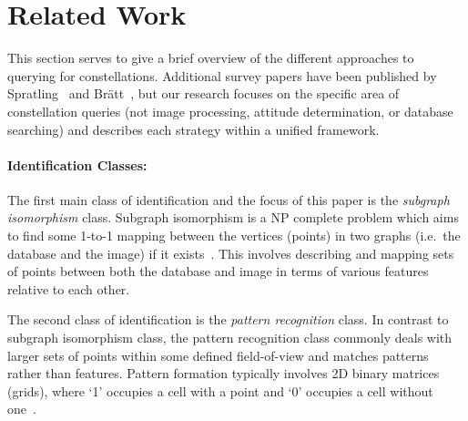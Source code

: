 \newcommand{\nsubparagraph}[1]{\paragraph{#1:}}

\section{Related Work}\label{sec:relatedWork}
\begin{figure}
\end{figure}

This section serves to give a brief overview of the different approaches to querying for constellations.
Additional survey papers have been published by Spratling~\cite{spratling:surveyStarIdentification} and
Br\"{a}tt~\cite{bratt:analysisStarIdentification}, but our research focuses on the specific area of constellation
queries (not image processing, attitude determination, or database searching) and describes each strategy within a unified framework.

\nsubparagraph{Identification Classes}
The first main class of identification and the focus of this paper is the \textit{subgraph isomorphism} class.
Subgraph isomorphism is a NP complete problem which aims to find some 1-to-1 mapping between the vertices (points) in two graphs (i.e.\ the database and the image) if it exists~\cite{scott:graphIsomorphismProblem}.
This involves describing and mapping sets of points between both the database and image in terms of various features relative to each other.

The second class of identification is the \textit{pattern recognition} class.
In contrast to subgraph isomorphism class, the pattern recognition class commonly deals with larger sets of points within some defined field-of-view and matches patterns rather than features.
Pattern formation typically involves 2D binary matrices (grids), where `1' occupies a cell with a point and `0' occupies a cell without one~\cite{padgett:gridAlgorithm}.

